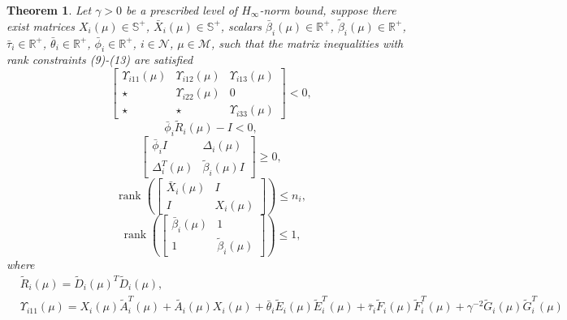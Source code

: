 \documentclass[11pt,draftcls,onecolumn]{IEEEtran}
\DeclareMathOperator{\rank}{rank}
\newtheorem{theorem}{Theorem}
\begin{document}
\begin{theorem}
\label{theorem 1}
Let $\gamma >0$ be a prescribed level of $H_{\infty}$-norm bound, suppose there exist matrices $ X_i(\mu)\in \mathbb{S}^{+} $, $ \bar{X}_i(\mu)\in \mathbb{S}^{+} $, scalars $\bar{\beta}_i(\mu) \in \mathbb{R}^{+}$, $\tilde{\beta}_i(\mu) \in \mathbb{R}^{+}$, $\bar{\tau}_i \in \mathbb{R}^{+}$,  $\bar{\theta}_i \in \mathbb{R}^{+}$, $\bar{\phi}_i \in \mathbb{R}^{+}$, $i\in \mathcal{N}$, $ \mu \in \mathcal{M}$, such that the matrix inequalities with rank constraints (9)-(13) are satisfied
\begin{equation}
\left[
\begin{array}{cccc}
\Upsilon_{i11}(\mu) & \Upsilon_{i12}(\mu) & \Upsilon_{i13}(\mu)\\
\star & \Upsilon_{i22}(\mu) & 0   \\
\star & \star    & \Upsilon_{i33}(\mu)
\end{array}
\right]<0,
\end{equation}
\begin{equation}
\bar{\phi}_i\tilde{R}_i(\mu)-I <0,
\end{equation}
\begin{equation}
\left[
\begin{array}{cc}
 \bar{\phi}_iI & \Delta_i(\mu) \\
\Delta_i^{T}(\mu) & \tilde{\beta}_i(\mu) I
\end{array}
\right] \ge 0,
\end{equation}
\begin{equation}
 \rank\left(
  \begin{bmatrix}
   \bar{X}_i(\mu)  & I\\
    I & X_i(\mu)
  \end{bmatrix}\right) \le n_i,
  \end{equation}
  \begin{equation}
   \rank\left(
 \begin{bmatrix}
\bar{\beta}_i(\mu)  & 1\\
1 & \tilde{\beta}_i(\mu)
\end{bmatrix}\right) \le 1,
 \end{equation}
where
\begin{align*}
& \tilde{R}_i(\mu)=\tilde{D}_i(\mu)^T\tilde{D}_i(\mu),\\
&\Upsilon_{i11}(\mu) =X_i(\mu)\tilde{A}_i^{T}(\mu)+\tilde{A_i}(\mu)X_i(\mu)+\bar{\theta}_i\tilde{E}_i(\mu)\tilde{E}_i^{T}(\mu)  +\bar{\tau}_i\tilde{F}_i(\mu)\tilde{F}_i^{T}(\mu)+\gamma^{-2}\tilde{G}_i(\mu)\tilde{G}_i^{T}(\mu)

\end{align*}
\end{theorem}
\end{document}
